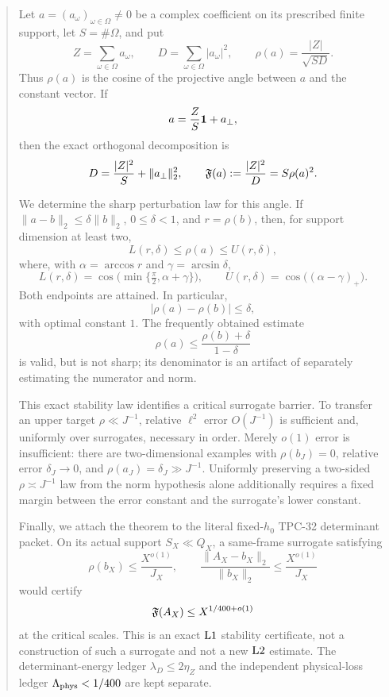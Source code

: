 \begin{abstract}
Let \(a=(a_\omega)_{\omega\in\Omega}\ne0\) be a complex coefficient
on its prescribed finite support, let \(S=\#\Omega\), and put
\[
 Z=\sum_{\omega\in\Omega}a_\omega,\qquad
 D=\sum_{\omega\in\Omega}|a_\omega|^2,\qquad
 \rho(a)=\frac{|Z|}{\sqrt{SD}}.
\]
Thus \(\rho(a)\) is the cosine of the projective angle between \(a\)
and the constant vector.  If
\[
 a=\frac{Z}{S}\one+a_\perp,
\]
then the exact orthogonal decomposition is
\[
 D=\frac{|Z|^2}{S}+\|a_\perp\|_2^2,\qquad
 \Flat(a):=\frac{|Z|^2}{D}=S\rho(a)^2.
\]

We determine the sharp perturbation law for this angle.  If
\(\|a-b\|_2\le\delta\|b\|_2\), \(0\le\delta<1\), and
\(r=\rho(b)\), then, for support dimension at least two,
\[
 L(r,\delta)\le\rho(a)\le U(r,\delta),
\]
where, with \(\alpha=\arccos r\) and
\(\gamma=\arcsin\delta\),
\[
 L(r,\delta)=\cos\!\bigl(\min\{\tfrac{\pi}{2},\alpha+\gamma\}\bigr),
 \qquad
 U(r,\delta)=\cos\!\bigl((\alpha-\gamma)_+\bigr).
\]
Both endpoints are attained.  In particular,
\[
 |\rho(a)-\rho(b)|\le\delta,
\]
with optimal constant \(1\).  The frequently obtained estimate
\[
 \rho(a)\le\frac{\rho(b)+\delta}{1-\delta}
\]
is valid, but is not sharp; its denominator is an artifact of
separately estimating the numerator and norm.

This exact stability law identifies a critical surrogate barrier.
To transfer an upper target \(\rho\ll J^{-1}\), relative
\(\ell^2\) error \(O(J^{-1})\) is sufficient and, uniformly over
surrogates, necessary in order.  Merely \(o(1)\) error is
insufficient: there are two-dimensional examples with
\(\rho(b_J)=0\), relative error \(\delta_J\to0\), and
\(\rho(a_J)=\delta_J\gg J^{-1}\).  Uniformly preserving a
two-sided \(\rho\asymp J^{-1}\) law from the norm hypothesis alone
additionally requires a fixed margin between the error constant and
the surrogate's lower constant.

Finally, we attach the theorem to the literal fixed-\(h_0\) TPC-32
determinant packet.  On its actual support \(S_X\ll Q_X\), a
same-frame surrogate satisfying
\[
 \rho(b_X)\le\frac{X^{o(1)}}{J_X},
 \qquad
 \frac{\|A_X-b_X\|_2}{\|b_X\|_2}
 \le\frac{X^{o(1)}}{J_X}
\]
would certify
\[
 \Flat(A_X)\le X^{1/400+o(1)}
\]
at the critical scales.  This is an exact \(\Lone\) stability
certificate, not a construction of such a surrogate and not a new
\(\Ltwo\) estimate.  The determinant-energy ledger
\(\lambda_D\le2\eta_Z\) and the independent physical-loss ledger
\(\Lambda_{\rm phys}<1/400\) are kept separate.
\end{abstract}
